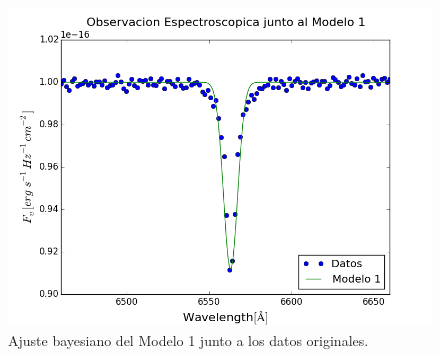\documentclass{article}
\begin{document}
\begin{figure}[ht]
  \centering
  \includegraphics[scale = 0.5]{images/datos_vs_modelo1.png}
  \caption{Ajuste bayesiano del Modelo 1 junto a los datos originales.}
  \label{fig:datos_vs_modelo1}
\end{figure}
\end{document}
